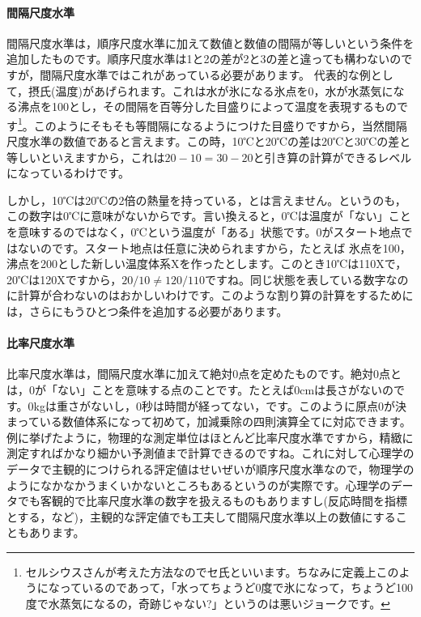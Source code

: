 \documentclass{ltjsbook}
\begin{document}
\paragraph{間隔尺度水準}
間隔尺度水準は，順序尺度水準に加えて数値と数値の間隔が等しいという条件を追加したものです。順序尺度水準は1と2の差が2と3の差と違っても構わないのですが，間隔尺度水準ではこれがあっている必要があります。
代表的な例として，摂氏(温度)があげられます。これは水が氷になる氷点を0，水が水蒸気になる沸点を100とし，その間隔を百等分した目盛りによって温度を表現するものです\footnote{セルシウスさんが考えた方法なのでセ氏といいます。ちなみに定義上このようになっているのであって，「水ってちょうど0度で氷になって，ちょうど100度で水蒸気になるの，奇跡じゃない?」というのは悪いジョークです。}。このようにそもそも等間隔になるようにつけた目盛りですから，当然間隔尺度水準の数値であると言えます。この時，10℃と20℃の差は20℃と30℃の差と等しいといえますから，これは$20-10=30-20$と引き算の計算ができるレベルになっているわけです。

しかし，10℃は20℃の2倍の熱量を持っている，とは言えません。というのも，この数字は0℃に意味がないからです。言い換えると，0℃は温度が「ない」ことを意味するのではなく，0℃という温度が「ある」状態です。0がスタート地点ではないのです。スタート地点は任意に決められますから，たとえば
氷点を100，沸点を200とした新しい温度体系Xを作ったとします。このとき10℃は110Xで，20℃は120Xですから，$20/10\neq 120/110$ですね。同じ状態を表している数字なのに計算が合わないのはおかしいわけです。このような割り算の計算をするためには，さらにもうひとつ条件を追加する必要があります。

\paragraph{比率尺度水準}
比率尺度水準は，間隔尺度水準に加えて絶対0点を定めたものです。絶対0点とは，0が「ない」ことを意味する点のことです。たとえば0cmは長さがないのです。0kgは重さがないし，0秒は時間が経ってない，です。このように原点0が決まっている数値体系になって初めて，加減乗除の四則演算全てに対応できます。例に挙げたように，物理的な測定単位はほとんど比率尺度水準ですから，精緻に測定すればかなり細かい予測値まで計算できるのですね。これに対して心理学のデータで主観的につけられる評定値はせいぜいが順序尺度水準なので，物理学のようになかなかうまくいかないところもあるというのが実際です。心理学のデータでも客観的で比率尺度水準の数字を扱えるものもありますし(反応時間を指標とする，など)，主観的な評定値でも工夫して間隔尺度水準以上の数値にすることもあります。
\end{document}
